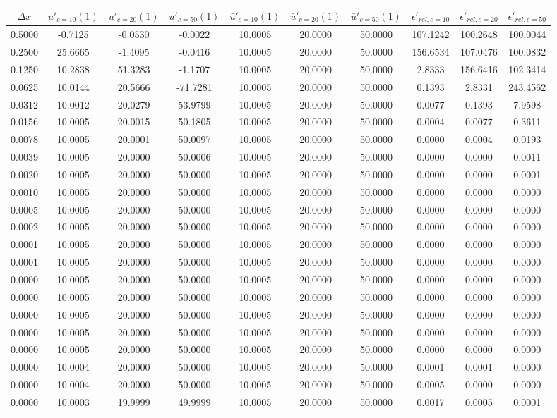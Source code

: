 \begin{tabular}{|c|c|c|c|c|c|c|c|c|c|}
\hline
\textbf{$\Delta x$}&\textbf{$u'_{c=10}(1)$}&\textbf{$u'_{c=20}(1)$}&\textbf{$u'_{c=50}(1)$}&\textbf{$\bar{u}'_{c=10}(1)$}&\textbf{$\bar{u}'_{c=20}(1)$}&\textbf{$\bar{u}'_{c=50}(1)$}&\textbf{$\epsilon'_{rel,c=10}$}&\textbf{$\epsilon'_{rel,c=20}$}&\textbf{$\epsilon'_{rel,c=50}$}\\\hline
0.5000&-0.7125&-0.0530&-0.0022&10.0005&20.0000&50.0000&107.1242&100.2648&100.0044\\\hline
0.2500&25.6665&-1.4095&-0.0416&10.0005&20.0000&50.0000&156.6534&107.0476&100.0832\\\hline
0.1250&10.2838&51.3283&-1.1707&10.0005&20.0000&50.0000&2.8333&156.6416&102.3414\\\hline
0.0625&10.0144&20.5666&-71.7281&10.0005&20.0000&50.0000&0.1393&2.8331&243.4562\\\hline
0.0312&10.0012&20.0279&53.9799&10.0005&20.0000&50.0000&0.0077&0.1393&7.9598\\\hline
0.0156&10.0005&20.0015&50.1805&10.0005&20.0000&50.0000&0.0004&0.0077&0.3611\\\hline
0.0078&10.0005&20.0001&50.0097&10.0005&20.0000&50.0000&0.0000&0.0004&0.0193\\\hline
0.0039&10.0005&20.0000&50.0006&10.0005&20.0000&50.0000&0.0000&0.0000&0.0011\\\hline
0.0020&10.0005&20.0000&50.0000&10.0005&20.0000&50.0000&0.0000&0.0000&0.0001\\\hline
0.0010&10.0005&20.0000&50.0000&10.0005&20.0000&50.0000&0.0000&0.0000&0.0000\\\hline
0.0005&10.0005&20.0000&50.0000&10.0005&20.0000&50.0000&0.0000&0.0000&0.0000\\\hline
0.0002&10.0005&20.0000&50.0000&10.0005&20.0000&50.0000&0.0000&0.0000&0.0000\\\hline
0.0001&10.0005&20.0000&50.0000&10.0005&20.0000&50.0000&0.0000&0.0000&0.0000\\\hline
0.0001&10.0005&20.0000&50.0000&10.0005&20.0000&50.0000&0.0000&0.0000&0.0000\\\hline
0.0000&10.0005&20.0000&50.0000&10.0005&20.0000&50.0000&0.0000&0.0000&0.0000\\\hline
0.0000&10.0005&20.0000&50.0000&10.0005&20.0000&50.0000&0.0000&0.0000&0.0000\\\hline
0.0000&10.0005&20.0000&50.0000&10.0005&20.0000&50.0000&0.0000&0.0000&0.0000\\\hline
0.0000&10.0005&20.0000&50.0000&10.0005&20.0000&50.0000&0.0000&0.0000&0.0000\\\hline
0.0000&10.0005&20.0000&50.0000&10.0005&20.0000&50.0000&0.0000&0.0000&0.0000\\\hline
0.0000&10.0004&20.0000&50.0000&10.0005&20.0000&50.0000&0.0001&0.0001&0.0000\\\hline
0.0000&10.0004&20.0000&50.0000&10.0005&20.0000&50.0000&0.0005&0.0000&0.0000\\\hline
0.0000&10.0003&19.9999&49.9999&10.0005&20.0000&50.0000&0.0017&0.0005&0.0001\\\hline
\end{tabular}
